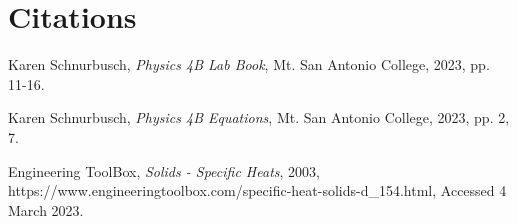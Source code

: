 \documentclass[12pt]{iopart} %
\begin{document}
\section{Citations}

\begin{thebibliography}{9}

  Karen Schnurbusch,
  \textit{Physics 4B Lab Book},
  Mt. San Antonio College,
  2023,
  pp. 11-16.

  Karen Schnurbusch,
  \textit{Physics 4B Equations},
  Mt. San Antonio College,
  2023,
  pp. 2, 7.

  Engineering ToolBox,
  \textit{Solids - Specific Heats},
  2003,
  https://www.engineeringtoolbox.com/specific-heat-solids-d_154.html,
  Accessed 4 March 2023.

\end{thebibliography}
\end{document}
